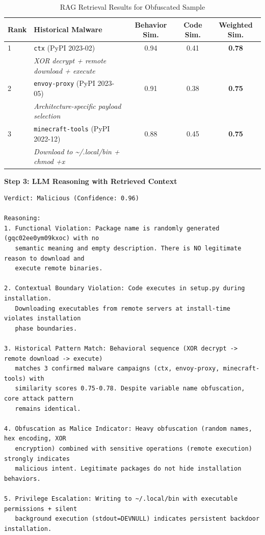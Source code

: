 \begin{table}[h]
\centering
\caption{RAG Retrieval Results for Obfuscated Sample}
\label{tab:rag-retrieval-obfuscated}
\small
\begin{tabular}{lp{4cm}ccc}
\toprule
\textbf{Rank} & \textbf{Historical Malware} & \textbf{Behavior Sim.} & \textbf{Code Sim.} & \textbf{Weighted Sim.} \\
\midrule
1 & \texttt{ctx} (PyPI 2023-02) & 0.94 & 0.41 & \textbf{0.78} \\
  & \textit{XOR decrypt + remote download + execute} & & & \\
2 & \texttt{envoy-proxy} (PyPI 2023-05) & 0.91 & 0.38 & \textbf{0.75} \\
  & \textit{Architecture-specific payload selection} & & & \\
3 & \texttt{minecraft-tools} (PyPI 2022-12) & 0.88 & 0.45 & \textbf{0.75} \\
  & \textit{Download to \textasciitilde/.local/bin + chmod +x} & & & \\
\bottomrule
\end{tabular}
\end{table}

\textbf{Step 3: LLM Reasoning with Retrieved Context}
\begin{lstlisting}
Verdict: Malicious (Confidence: 0.96)

Reasoning:
1. Functional Violation: Package name is randomly generated (gqc02ee0ym09kxoc) with no 
   semantic meaning and empty description. There is NO legitimate reason to download and 
   execute remote binaries.

2. Contextual Boundary Violation: Code executes in setup.py during installation. 
   Downloading executables from remote servers at install-time violates installation 
   phase boundaries.

3. Historical Pattern Match: Behavioral sequence (XOR decrypt -> remote download -> execute) 
   matches 3 confirmed malware campaigns (ctx, envoy-proxy, minecraft-tools) with 
   similarity scores 0.75-0.78. Despite variable name obfuscation, core attack pattern 
   remains identical.

4. Obfuscation as Malice Indicator: Heavy obfuscation (random names, hex encoding, XOR 
   encryption) combined with sensitive operations (remote execution) strongly indicates 
   malicious intent. Legitimate packages do not hide installation behaviors.

5. Privilege Escalation: Writing to ~/.local/bin with executable permissions + silent 
   background execution (stdout=DEVNULL) indicates persistent backdoor installation.
\end{lstlisting}

